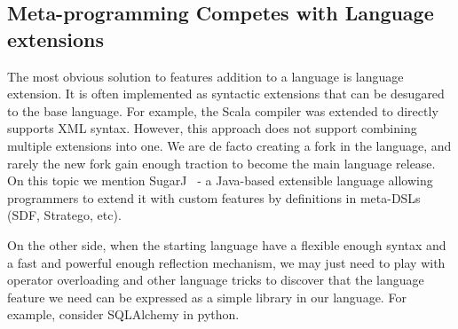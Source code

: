 \begin{comment}
\subsection{Type-Directed Translations/Syntactic Sugar}
\marco{I'm tring to merge this and the next one}
Language extensions are often implemented as syntactic sugar of the base
language. For example, Scala compiler supports XML syntax in normal Scala code
directly (after Scala ?, users need to import \texttt{scala-xml} library
manually). However, this approach is hard in terms of implementation, because it
requires extending the compiler. Also, this approach does not support combining
multiple extensions into one.

SugarJ~\cite{erdweg11sugarj} is a Java-based extensible programming language
that allows programmers to extend the base language with custom language
features by definitions in meta-DSLs (SDF, Stratego, etc). 
\yanlin{Is new syntax really a ``drawback''? I think for some system, like
  SugarJ, one of purpose IS to introduce these new syntax.}  Drawbacks: new
syntax. To create the extension, programmers have to work with multiple
languages (SDF, stratego, etc) while our approach works totally in Java
environment.

We can model certain types of language extensions with annotations 
only, but those extensions do not introduce new syntax: they 
merely do automatic code generation. 
\end{comment}
\subsection{Meta-programming Competes with Language extensions}
The most obvious solution to features addition to a language is language
extension.  It is often implemented as syntactic extensions that can be
desugared to the base language. For example, the Scala compiler was extended to
directly supports XML syntax. However, this approach does not support combining
multiple extensions into one. We are de facto creating a fork in the language,
and rarely the new fork gain enough traction to become the main language
release.  On this topic we mention SugarJ~\cite{erdweg11sugarj} - a Java-based
extensible language allowing programmers to extend it with custom features by
definitions in meta-DSLs (SDF, Stratego, etc).

On the other side, when the starting language have a flexible enough syntax and
a fast and powerful enough reflection mechanism, we may just need to play with
operator overloading and other language tricks to discover that the language
feature we need can be expressed as a simple library in our language. For
example, consider SQLAlchemy in python.

